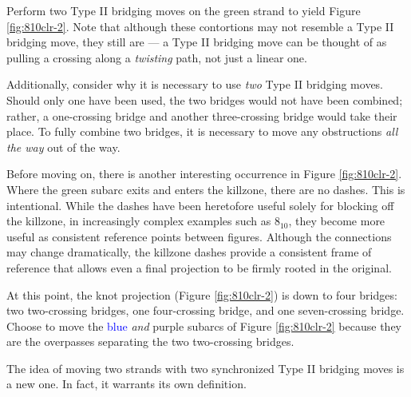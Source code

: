 \documentclass[titlepage]{article}
\begin{document}
Perform two Type II bridging moves on the \textcolor{grx}{green} strand to yield Figure \ref{fig:810clr-2}. Note that although these contortions may not resemble a Type II bridging move, they still are --- a Type II bridging move can be thought of as pulling a crossing along a \emph{twisting} path, not just a linear one.\par
Additionally, consider why it is necessary to use \emph{two} Type II bridging moves. Should only one have been used, the two bridges would not have been combined; rather, a one-crossing bridge and another three-crossing bridge would take their place. To fully combine two bridges, it is necessary to move any obstructions \emph{all the way} out of the way.\par
Before moving on, there is another interesting occurrence in Figure \ref{fig:810clr-2}. Where the \textcolor{grx}{green} subarc exits and enters the killzone, there are no dashes. This is intentional. While the dashes have been heretofore useful solely for blocking off the killzone, in increasingly complex examples such as $8_{10}$, they become more useful as consistent reference points between figures. Although the connections may change dramatically, the killzone dashes provide a consistent frame of reference that allows even a final projection to be firmly rooted in the original.\par
At this point, the knot projection (Figure \ref{fig:810clr-2}) is down to four bridges: two two-crossing bridges, one four-crossing bridge, and one seven-crossing bridge. Choose to move the \textcolor{blue}{blue} \emph{and} \textcolor{pux}{purple} subarcs of Figure \ref{fig:810clr-2} because they are the overpasses separating the two two-crossing bridges.\par
The idea of moving two strands with two synchronized Type II bridging moves is a new one. In fact, it warrants its own definition.\par
\end{document}
